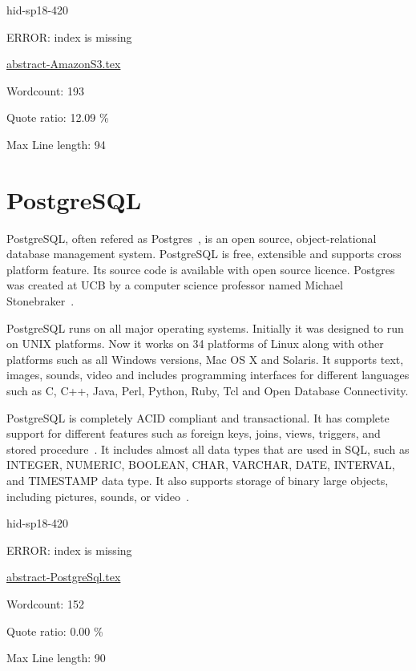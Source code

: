 \begin{IU}

hid-sp18-420

ERROR: index is missing

\href{https://github.com/cloudmesh-community/hid-sp18-420/blob/master//technology/abstract-AmazonS3.tex}{abstract-AmazonS3.tex}

 

Wordcount: 193


Quote ratio: 12.09 \%
 
Max Line length: 94
\end{IU}

\section{PostgreSQL}

PostgreSQL, often refered as Postgres~\cite{hid-sp18-420-PostgreSQL_About}, is an
open source, object-relational database management system. PostgreSQL is free,
extensible and supports cross platform feature. Its source code is available
with open source licence. Postgres was created at UCB by a computer science
professor named Michael Stonebraker~\cite{hid-sp18-420-PostgreSQL_History}.

PostgreSQL runs on all major operating systems. Initially it was designed to run
on UNIX platforms. Now it works on 34 platforms of Linux along with other
platforms such as all Windows versions, Mac OS X and Solaris. It supports text,
images, sounds, video and includes programming interfaces for different
languages such as C, C++, Java, Perl, Python, Ruby, Tcl and Open Database
Connectivity.

PostgreSQL is completely ACID compliant and transactional. It has complete
support for different features such as foreign keys, joins, views, triggers, and
stored procedure~\cite{hid-sp18-420-PostgreSQL_Wiki}. It includes almost all
data types that are used in SQL, such as INTEGER, NUMERIC, BOOLEAN, CHAR,
VARCHAR, DATE, INTERVAL, and TIMESTAMP data type. It also supports storage of binary large
objects, including pictures, sounds, or
video~\cite{hid-sp18-420-PostgreSQL_About}.


\begin{IU}

hid-sp18-420

ERROR: index is missing

\href{https://github.com/cloudmesh-community/hid-sp18-420/blob/master//technology/abstract-PostgreSql.tex}{abstract-PostgreSql.tex}

 

Wordcount: 152


Quote ratio: 0.00 \%
 
Max Line length: 90
\end{IU}


